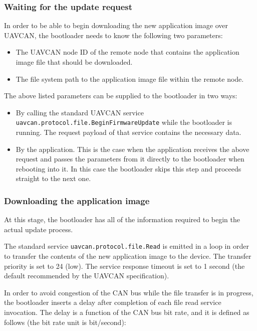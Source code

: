 \documentclass{zubaxdoc}
\begin{document}
\subsubsection{Waiting for the update request}\label{sec:bootloader_uavcan_begin_update_request}

In order to be able to begin downloading the new application image over UAVCAN,
the bootloader needs to know the following two parameters:
\begin{itemize}
    \item The UAVCAN node ID of the remote node that contains the application image file
          that should be downloaded.

    \item The file system path to the application image file within the remote node.
\end{itemize}

The above listed parameters can be supplied to the bootloader in two ways:
\begin{itemize}
    \item By calling the standard UAVCAN service \verb|uavcan.protocol.file.BeginFirmwareUpdate|
          while the bootloader is running.
          The request payload of that service contains the necessary data.
          
    \item By the application. This is the case when the application receives the above request
          and passes the parameters from it directly to the bootloader when rebooting into it.
          In this case the bootloader skips this step and proceeds straight to the next one.
\end{itemize}

\subsubsection{Downloading the application image}\label{sec:bootloader_uavcan_file_transfer}

At this stage, the bootloader has all of the information required to begin the actual update process.

The standard service \verb|uavcan.protocol.file.Read| is emitted in a loop in order to transfer
the contents of the new application image to the device.
The transfer priority is set to 24 (low).
The service response timeout is set to 1 second (the default recommended by the UAVCAN specification).

In order to avoid congestion of the CAN bus while the file transfer is in progress,
the bootloader inserts a delay after completion of each file read service invocation.
The delay is a function of the CAN bus bit rate, and it is defined as follows
(the bit rate unit is bit/second):
\end{document}
